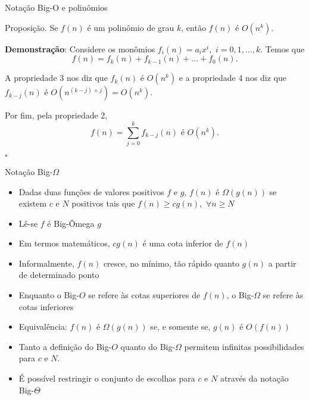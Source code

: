 \begin{frame}[fragile]{Notação Big-O e polinômios}

	\begin{block}{Proposição.}
	Se $f(n)$ é um polinômio de grau $k$, então $f(n)$ é $O(n^k)$.
	\end{block}

	\textbf{Demonstração}: Considere os {monômios} 
	$f_i(n) = a_ix^i,\, \, i = 0, 1, \ldots, k$.  Temos que
	$$
		f(n) = f_k(n) + f_{k-1}(n) + \ldots + f_0(n).
	$$

	A {propriedade} 3 nos diz que $f_k(n)$ é $O(n^k)$ e a 
	{propriedade} 4 
	nos diz que $f_{k-j}(n)$ é $O(n^{(k-j) + j}) = O(n^k)$.

	Por fim, pela {propriedade} 2, 
	\[f(n) = \sum_{j=0}^{k} f_{k - j}(n)\, \, \mbox{é}\, \, O(n^k).\]
	\begin{flushright}
    $\square$
	\end{flushright}

\end{frame}

\begin{frame}[fragile]{Notação Big-$\Omega$}

	\begin{itemize}
		\item Dadas {duas} funções de valores 
		{positivos} $f$ e $g$, $f(n)$ é $\Omega(g(n))$ se 
		existem $c$ e $N$ {positivos} tais que $f(n) \geq cg(n),\, \, \forall n\geq N$

		\item Lê-se $f$ é {Big-Ômega} $g$

		\item Em termos matemáticos, $cg(n)$ é uma cota inferior de $f(n)$

		\item {Informalmente}, $f(n)$ cresce, no mínimo, 
		tão rápido quanto $g(n)$ a partir de determinado ponto

		\item Enquanto o Big-$O$ se refere às cotas superiores de 
		$f(n)$, o Big-$\Omega$ se refere às cotas inferiores

		\item Equivalência: $f(n)$ é $\Omega(g(n))$ se, e 
		somente se, $g(n)$ é $O(f(n))$

		\item Tanto a definição do Big-$O$ quanto do Big-$\Omega$ 
		permitem infinitas possibilidades para $c$ e $N$.

		\item É possível restringir o conjunto de escolhas para 
		$c$ e $N$ através da notação Big-$\Theta$
	\end{itemize}

\end{frame}

